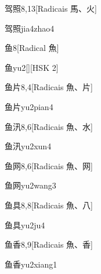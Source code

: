 \begin{entry}{驾照}{8,13}[Radicais ⾺、⽕]
  \begin{phonetics}{驾照}{jia4zhao4}
  \end{phonetics}
\end{entry}

\begin{entry}{鱼}{8}[Radical ⿂]
  \begin{phonetics}{鱼}{yu2}[][HSK 2]
  \end{phonetics}
\end{entry}

\begin{entry}{鱼片}{8,4}[Radicais ⿂、⽚]
  \begin{phonetics}{鱼片}{yu2pian4}
  \end{phonetics}
\end{entry}

\begin{entry}{鱼汛}{8,6}[Radicais ⿂、⽔]
  \begin{phonetics}{鱼汛}{yu2xun4}
  \end{phonetics}
\end{entry}

\begin{entry}{鱼网}{8,6}[Radicais ⿂、⽹]
  \begin{phonetics}{鱼网}{yu2wang3}
  \end{phonetics}
\end{entry}

\begin{entry}{鱼具}{8,8}[Radicais ⿂、⼋]
  \begin{phonetics}{鱼具}{yu2ju4}
  \end{phonetics}
\end{entry}

\begin{entry}{鱼香}{8,9}[Radicais ⿂、⾹]
  \begin{phonetics}{鱼香}{yu2xiang1}
  \end{phonetics}
\end{entry}

